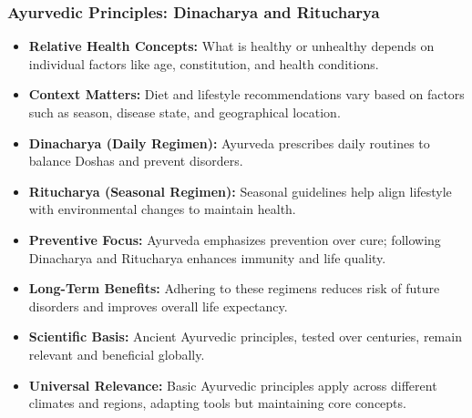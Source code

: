 \begin{frame}[fragile]\frametitle{Ayurvedic Principles: Dinacharya and Ritucharya}

      \begin{itemize}
        \item \textbf{Relative Health Concepts:} What is healthy or unhealthy depends on individual factors like age, constitution, and health conditions.
        \item \textbf{Context Matters:} Diet and lifestyle recommendations vary based on factors such as season, disease state, and geographical location.
        \item \textbf{Dinacharya (Daily Regimen):} Ayurveda prescribes daily routines to balance Doshas and prevent disorders.
        \item \textbf{Ritucharya (Seasonal Regimen):} Seasonal guidelines help align lifestyle with environmental changes to maintain health.
        \item \textbf{Preventive Focus:} Ayurveda emphasizes prevention over cure; following Dinacharya and Ritucharya enhances immunity and life quality.
        \item \textbf{Long-Term Benefits:} Adhering to these regimens reduces risk of future disorders and improves overall life expectancy.
        \item \textbf{Scientific Basis:} Ancient Ayurvedic principles, tested over centuries, remain relevant and beneficial globally.
        \item \textbf{Universal Relevance:} Basic Ayurvedic principles apply across different climates and regions, adapting tools but maintaining core concepts.
      \end{itemize}

\end{frame}

